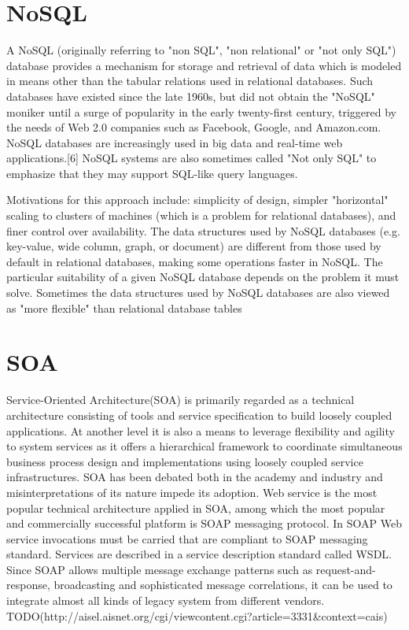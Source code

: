 \section{NoSQL}
A NoSQL (originally referring to "non SQL", "non relational" or "not only
SQL") database provides a mechanism for storage and retrieval of data which
is modeled in means other than the tabular relations used in relational
databases. Such databases have existed since the late 1960s, but did not obtain
the "NoSQL" moniker until a surge of popularity in the early twenty-first
century, triggered by the needs of Web 2.0 companies such as Facebook,
Google, and Amazon.com. NoSQL databases are increasingly used in big
data and real-time web applications.[6] NoSQL systems are also sometimes called
"Not only SQL" to emphasize that they may support SQL-like query
languages.

Motivations for this approach include: simplicity of design, simpler
"horizontal" scaling to clusters of machines (which is a problem for relational
databases), and finer control over availability. The data structures used by
NoSQL databases (e.g. key-value, wide column, graph, or document) are different
from those used by default in relational databases, making some operations
faster in NoSQL. The particular suitability of a given NoSQL database depends on
the problem it must solve. Sometimes the data structures used by NoSQL databases
are also viewed as "more flexible" than relational database tables

\section{SOA}
Service-Oriented Architecture(SOA) is primarily regarded as a technical
architecture consisting of tools and service specification to build loosely
coupled applications. At another level it is also a means to leverage
flexibility and agility to system services as it offers a hierarchical framework
to coordinate simultaneous business process design and implementations using
loosely coupled service infrastructures. SOA has been debated both in the
academy and industry and misinterpretations of its nature impede its adoption.
Web service is the most popular technical architecture applied in SOA, among
which the most popular and commercially successful platform is SOAP messaging
protocol. In SOAP Web service invocations must be carried that are compliant to
SOAP messaging standard. Services are described in a service description
standard called WSDL. Since SOAP allows multiple message exchange patterns such
as request-and-response, broadcasting and sophisticated message correlations, it
can be used to integrate almost all kinds of legacy system from different
vendors.
TODO(http://aisel.aisnet.org/cgi/viewcontent.cgi?article=3331&context=cais)

